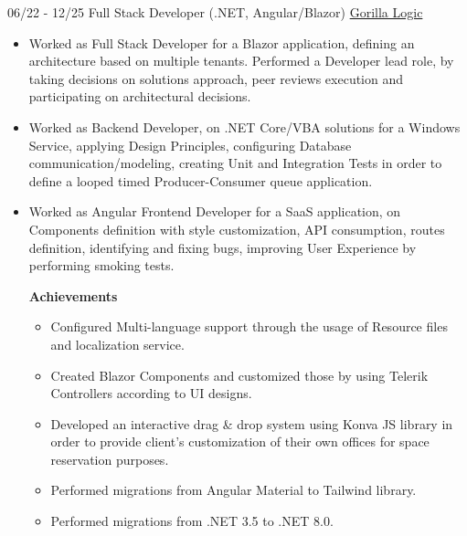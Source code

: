 \documentclass[letterpaper]{twentysecondcv} %
\begin{document}
\begin{twenty}
{\begin{itemize}
            \end{itemize}
        }

        \twentyitem
        {06/22 - 12/25}
        {Full Stack Developer (.NET, Angular/Blazor)}
        { \href{https://gorillalogic.com/}{Gorilla Logic} }
        {
            \begin{itemize}
                \item Worked as Full Stack Developer for a Blazor application, defining an architecture based on multiple tenants. Performed a Developer lead role, by taking decisions on solutions approach, peer reviews execution and participating on architectural decisions.

                \item Worked as Backend Developer, on .NET Core/VBA solutions for a Windows Service, applying Design Principles, configuring Database communication/modeling, creating Unit and Integration Tests in order to define a looped timed Producer-Consumer queue application.
                    
                \item Worked as Angular Frontend Developer for a SaaS application, on Components definition with style customization, API consumption, routes definition, identifying and fixing bugs, improving User Experience by performing smoking tests.

                \textbf{Achievements}
                \begin{itemize}
                    \item Configured Multi-language support through the usage of Resource files and localization service.
                
                    \item Created Blazor Components and customized those by using Telerik Controllers according to UI designs.
                
                    \item Developed an interactive drag \& drop system using Konva JS library in order to provide client's customization of their own offices for space reservation purposes.

                    \item Performed migrations from Angular Material to Tailwind library.

                    \item Performed migrations from .NET 3.5 to .NET 8.0.
                \end{itemize}
            

\end{itemize}}
\end{twenty}
\end{document}
